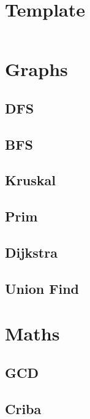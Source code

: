 \documentclass[twoside]{article}
\begin{document}
% 
\null
\thispagestyle{empty}
\newpage
{}
\selectfont
\begin{multicols*}{2}
	\tableofcontents
	\newpage
	\cleardoublepage
	
	\section{Template}
	    \inputminted{cpp}{template.cpp}
	\section{Graphs}
	    \subsection{DFS}
	    \subsection{BFS}
	    \subsection{Kruskal}
	    \subsection{Prim}
	    \subsection{Dijkstra}
	    \subsection{Union Find}
	
	\section{Maths}
	    \subsection{GCD}
	    \subsection{Criba}
	    

\end{multicols*}
\end{document}
